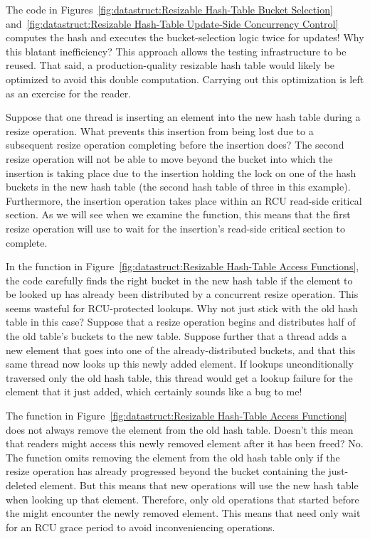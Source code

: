 \QuickQ{}
	The code in
	Figures~\ref{fig:datastruct:Resizable Hash-Table Bucket Selection}
	and~\ref{fig:datastruct:Resizable Hash-Table Update-Side Concurrency Control}
	computes the hash and executes the bucket-selection logic twice for
	updates!
	Why this blatant inefficiency?
\QuickA{}
	This approach allows the  testing infrastructure
	to be reused.
	That said, a production-quality resizable hash table would likely
	be optimized to avoid this double computation.
	Carrying out this optimization is left as an exercise for the reader.

\QuickQ{}
	Suppose that one thread is inserting an element into the
	new hash table during a resize operation.
	What prevents this insertion from being lost due to a subsequent
	resize operation completing before the insertion does?
\QuickA{}
	The second resize operation will not be able to move beyond
	the bucket into which the insertion is taking place due to
	the insertion holding the lock on one of the hash buckets in
	the new hash table (the second hash table of three in this
	example).
	Furthermore, the insertion operation takes place within an
	RCU read-side critical section.
	As we will see when we examine the 
	function, this means that the first resize operation will
	use
	 to wait for the insertion's read-side
	critical section to complete.

\QuickQ{}
	In the  function in
	Figure~\ref{fig:datastruct:Resizable Hash-Table Access Functions},
	the code carefully finds the right bucket in the new hash table
	if the element to be looked up has already been distributed
	by a concurrent resize operation.
	This seems wasteful for RCU-protected lookups.
	Why not just stick with the old hash table in this case?
\QuickA{}
	Suppose that a resize operation begins and distributes half of
	the old table's buckets to the new table.
	Suppose further that a thread adds a new element that goes into
	one of the already-distributed buckets, and that this same thread
	now looks up this newly added element.
	If lookups unconditionally traversed only the old hash table,
	this thread would get a lookup failure for the element that it
	just added, which certainly sounds like a bug to me!

\QuickQ{}
	The  function in
	Figure~\ref{fig:datastruct:Resizable Hash-Table Access Functions}
	does not always remove the element from the old hash table.
	Doesn't this mean that readers might access this newly removed
	element after it has been freed?
\QuickA{}
	No.
	The  function omits removing the element
	from the old hash table only if the resize operation has
	already progressed beyond the bucket containing the just-deleted
	element.
	But this means that new  operations will
	use the new hash table when looking up that element.
	Therefore, only old  operations that started
	before the  might encounter the newly
	removed element.
	This means that  need only wait for an
	RCU grace period to avoid inconveniencing
	 operations.

